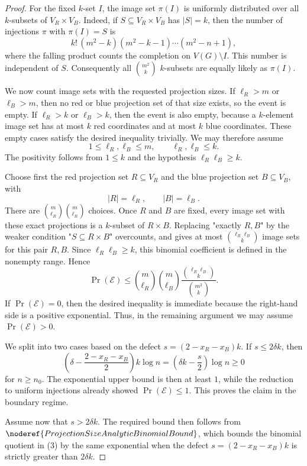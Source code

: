 \begin{proof}
For the fixed \(k\)-set \(I\), the image set \(\pi(I)\) is uniformly
distributed over all \(k\)-subsets of \(V_R\times V_B\).  Indeed, if
\(S\subseteq V_R\times V_B\) has \(|S|=k\), then the number of injections
\(\pi\) with \(\pi(I)=S\) is
\[
k!\,(m^2-k)(m^2-k-1)\cdots(m^2-n+1),
\]
where the falling product counts the completion on \(V(G)\setminus I\).  This
number is independent of \(S\).  Consequently all \(\binom{m^2}{k}\)
\(k\)-subsets are equally likely as \(\pi(I)\).

We now count image sets with the requested projection sizes.  If
\(\ell_R>m\) or \(\ell_B>m\), then no red or blue projection set of that size
exists, so the event is empty.  If \(\ell_R>k\) or \(\ell_B>k\), then the event
is also empty, because a \(k\)-element image set has at most \(k\) red
coordinates and at most \(k\) blue coordinates.  These empty cases satisfy the
desired inequality trivially.  We may therefore assume
\[
1\le \ell_R,\ell_B\le m,\qquad
\ell_R,\ell_B\le k.
\]
The positivity follows from \(1\le k\) and the hypothesis \(\ell_R\ell_B\ge k\).

Choose first the red projection set \(R\subseteq V_R\) and the blue projection
set \(B\subseteq V_B\), with
\[
|R|=\ell_R,\qquad |B|=\ell_B.
\]
There are \(\binom m{\ell_R}\binom m{\ell_B}\) choices.  Once \(R\) and \(B\)
are fixed, every image set with these exact projections is a \(k\)-subset of
\(R\times B\).  Replacing "exactly \(R,B\)" by the weaker condition
"\(S\subseteq R\times B\)" overcounts, and gives at most
\(\binom{\ell_R\ell_B}{k}\) image sets for this pair \(R,B\).  Since
\(\ell_R\ell_B\ge k\), this binomial coefficient is defined in the nonempty
range.  Hence
\[
\Pr(\mathcal E)
\le
\binom m{\ell_R}\binom m{\ell_B}
\frac{\binom{\ell_R\ell_B}{k}}{\binom{m^2}{k}}.
\tag{3}
\]
If \(\Pr(\mathcal E)=0\), then the desired inequality is immediate because the
right-hand side is a positive exponential.  Thus, in the remaining argument we
may assume \(\Pr(\mathcal E)>0\).

We split into two cases based on the defect \(s=(2-x_R-x_B)k\).  If \(s\le2\delta k\), then
\[
\left(\delta-\frac{2-x_R-x_B}{2}\right)k\log n
=\left(\delta k-\frac{s}{2}\right)\log n\ge0
\]
for \(n\ge n_0\).  The exponential upper bound is then at least \(1\), while
the reduction to uniform injections already showed \(\Pr(\mathcal E)\le1\).
This proves the claim in the boundary regime.

Assume now that \(s>2\delta k\).  The required bound then follows from
\(\noderef{ProjectionSizeAnalyticBinomialBound}\), which bounds the binomial quotient in (3)
by the same exponential when the defect \(s=(2-x_R-x_B)k\) is strictly greater than \(2\delta k\).
\end{proof}
